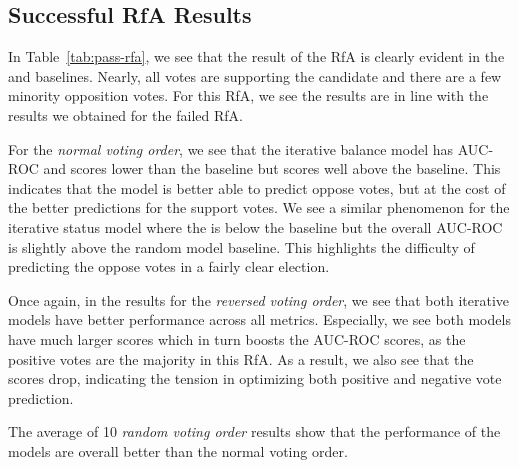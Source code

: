 \subsection{Successful RfA Results}
In Table~\ref{tab:pass-rfa}, we see that the result of the RfA is clearly evident in the \aucposPR and \aucnegPR baselines.
Nearly, all votes are supporting the candidate and there are a few minority opposition votes. 
For this RfA, we see the results are in line with the results we obtained for the failed RfA.

For the \textit{normal voting order}, we see that the iterative balance model has AUC-ROC and \aucposPR scores lower than the baseline but \aucnegPR scores well above the baseline.
This indicates that the model is better able to predict oppose votes, but at the cost of the better predictions for the support votes. 
We see a similar phenomenon for the iterative status model where the \aucposPR is below the baseline but the overall AUC-ROC is slightly above the random model baseline.
This highlights the difficulty of predicting the oppose votes in a fairly clear election.

Once again, in the results for the \textit{reversed voting order}, we see that both iterative models have better performance across all metrics.
Especially, we see both models have much larger \aucposPR scores which in turn boosts the AUC-ROC scores, as the positive votes are the majority in this RfA.
As a result, we also see that the \aucnegPR scores drop, indicating the tension in optimizing both positive and negative vote prediction.

The average of 10 \textit{random voting order} results show that the performance of the models are overall better than the normal voting order.


